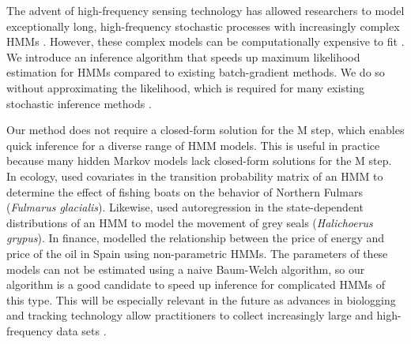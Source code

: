 
The advent of high-frequency sensing technology has allowed researchers to model exceptionally long, high-frequency stochastic processes with increasingly complex HMMs \citep{Patterson:2017}. However, these complex models can be computationally expensive to fit \citep{Glennie:2023}.
We introduce an inference algorithm that speeds up maximum likelihood estimation for HMMs compared to existing batch-gradient methods. We do so without approximating the likelihood, which is required for many existing stochastic inference methods \citep{Gotoh:1998,Ye:2017}. %

Our method does not require a closed-form solution for the M step, which enables quick inference for a diverse range of HMM models. This is useful in practice because many hidden Markov models lack closed-form solutions for the M step. In ecology, \citet{Pirotta:2018} used covariates in the transition probability matrix of an HMM to determine the effect of fishing boats on the behavior of Northern Fulmars (\textit{Fulmarus glacialis}). Likewise, \citet{Lawler:2019} used autoregression in the state-dependent distributions of an HMM to model the movement of grey seals (\textit{Halichoerus grypus}). In finance, \citet{Langrock:2018} modelled the relationship between the price of energy and price of the oil in Spain using non-parametric HMMs. The parameters of these models can not be estimated using a naive Baum-Welch algorithm, so our algorithm is a good candidate to speed up inference for complicated HMMs of this type. This will be especially relevant in the future as advances in biologging and tracking technology allow practitioners to collect increasingly large and high-frequency data sets \citep{Patterson:2017}.

